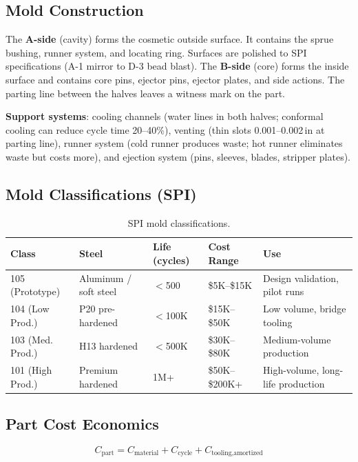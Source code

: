 \documentclass[11pt,letterpaper,twoside,openany]{book}
\begin{document}
\subsection{Mold Construction}

The \textbf{A-side} (cavity) forms the cosmetic outside surface. It contains the sprue bushing, runner system, and locating ring. Surfaces are polished to SPI specifications (A-1 mirror to D-3 bead blast). The \textbf{B-side} (core) forms the inside surface and contains core pins, ejector pins, ejector plates, and side actions. The parting line between the halves leaves a witness mark on the part.

\textbf{Support systems}: cooling channels (water lines in both halves; conformal cooling can reduce cycle time 20--40\%), venting (thin slots 0.001--0.002\,in at parting line), runner system (cold runner produces waste; hot runner eliminates waste but costs more), and ejection system (pins, sleeves, blades, stripper plates).

\subsection{Mold Classifications (SPI)}

\begin{table}[htbp]
\centering\small
\begin{tabularx}{\textwidth}{l l l l X}
  \toprule
  \textbf{Class} & \textbf{Steel} & \textbf{Life (cycles)} & \textbf{Cost Range} & \textbf{Use} \\
  \midrule
  105 (Prototype) & Aluminum / soft steel & $<$500 & \$5K--\$15K & Design validation, pilot runs \\
  104 (Low Prod.) & P20 pre-hardened & $<$100K & \$15K--\$50K & Low volume, bridge tooling \\
  103 (Med. Prod.) & H13 hardened & $<$500K & \$30K--\$80K & Medium-volume production \\
  101 (High Prod.) & Premium hardened & 1M+ & \$50K--\$200K+ & High-volume, long-life production \\
  \bottomrule
\end{tabularx}
\caption{SPI mold classifications.}
\end{table}

\subsection{Part Cost Economics}

\begin{equation}
  C_{\text{part}} = C_{\text{material}} + C_{\text{cycle}} + C_{\text{tooling,amortized}}
\end{equation}
\end{document}
